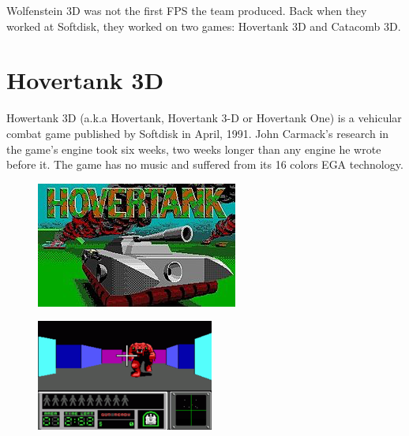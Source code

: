 Wolfenstein 3D was not the first FPS the team produced. Back when they worked at Softdisk, they worked on two games: Hovertank 3D and Catacomb 3D.\\
\par
\section{Hovertank 3D}
Howertank 3D (a.k.a Hovertank, Hovertank 3-D or Hovertank One)  is a vehicular combat game published by Softdisk in April, 1991. John Carmack's research in the game's engine took six weeks, two weeks longer than any engine he wrote before it. The game has no music and suffered from its 16 colors EGA technology.
\begin{figure}[H]
\centering
\includegraphics[width=\textwidth]{imgs/Hovertank_3D_title_screen.png}
\end{figure}

\begin{figure}[H]
\centering
\includegraphics[width=\textwidth]{imgs/Hovertank_3D_screen.png}
\end{figure}



